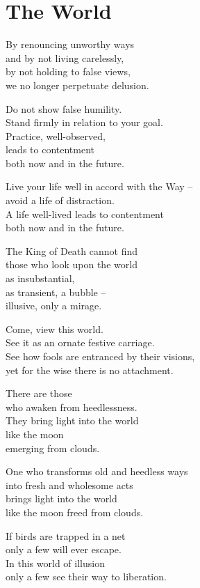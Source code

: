 
\chapter{The World}


By renouncing unworthy ways\\
and by not living carelessly,\\
by not holding to false views,\\
we no longer perpetuate delusion.


Do not show false humility.\\
Stand firmly in relation to your goal.\\
Practice, well-observed,\\
leads to contentment\\
both now and in the future.


Live your life well in accord with the Way --\\
avoid a life of distraction.\\
A life well-lived leads to contentment\\
both now and in the future.


The King of Death cannot find\\
those who look upon the world\\
as insubstantial,\\
as transient, a bubble --\\
illusive, only a mirage.


Come, view this world.\\
See it as an ornate festive carriage.\\
See how fools are entranced by their visions,\\
yet for the wise there is no attachment.


There are those\\
who awaken from heedlessness.\\
They bring light into the world\\
like the moon\\
emerging from clouds.


One who transforms old and heedless ways\\
into fresh and wholesome acts\\
brings light into the world\\
like the moon freed from clouds.


If birds are trapped in a net\\
only a few will ever escape.\\
In this world of illusion\\
only a few see their way to liberation.


